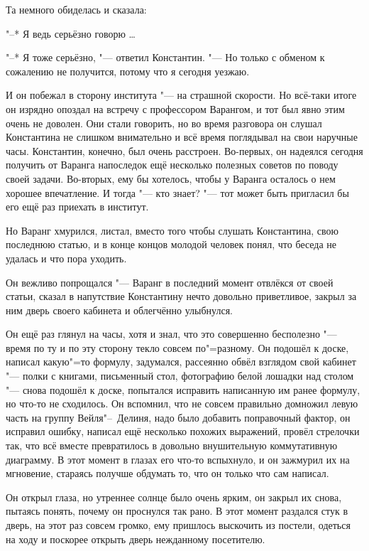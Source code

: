 Та немного обиделась и сказала:

"--* Я ведь серьёзно говорю \ldots

"--* Я тоже серьёзно, "--- ответил Константин.
"--- Но только с обменом к сожалению не получится, потому что я сегодня уезжаю.

И он побежал в сторону института "--- на страшной скорости.
Но всё-таки итоге он изрядно опоздал на встречу с профессором Варангом, и тот
был явно этим очень не доволен.
Они стали говорить, но во время разговора он слушал Константина не слишком
внимательно и всё время поглядывал на свои наручные часы.
Константин, конечно, был очень расстроен.
Во-первых, он надеялся сегодня получить от Варанга напоследок ещё несколько
полезных советов по поводу своей задачи.
Во-вторых, ему бы хотелось, чтобы у Варанга осталось о нем хорошее впечатление.
И тогда "--- кто знает? "--- тот может быть пригласил бы его ещё раз приехать в
институт.

Но Варанг хмурился, листал, вместо того чтобы слушать Константина, свою
последнюю статью, и в конце концов молодой человек понял, что беседа не удалась
и что пора уходить.

Он вежливо попрощался "--- Варанг в последний момент отвлёкся от своей статьи,
сказал в напутствие Константину нечто довольно приветливое, закрыл за ним дверь
своего кабинета и облегчённо улыбнулся.

Он ещё раз глянул на часы, хотя и знал, что это совершенно бесполезно "--- время
по ту и по эту сторону текло совсем по"=разному.
Он подошёл к доске, написал какую"=то формулу, задумался, рассеянно обвёл
взглядом свой кабинет "--- полки с книгами, письменный стол, фотографию белой
лошадки над столом "--- снова подошёл к доске, попытался исправить написанную
им ранее формулу, но что-то не сходилось.
Он вспомнил, что не совсем правильно домножил левую часть на группу
Вейля"--~Делиня, надо было добавить поправочный фактор, он исправил ошибку,
написал ещё несколько похожих выражений, провёл стрелочки так, что всё вместе
превратилось в довольно внушительную коммутативную диаграмму.
В этот момент в глазах его что-то вспыхнуло, и он зажмурил их на мгновение,
стараясь получше обдумать то, что он только что сам написал.

Он открыл глаза, но утреннее солнце было очень ярким, он закрыл их снова,
пытаясь понять, почему он проснулся так рано.
В этот момент раздался стук в дверь, на этот раз совсем громко, ему пришлось
выскочить из постели, одеться на ходу и поскорее открыть дверь нежданному
посетителю.

